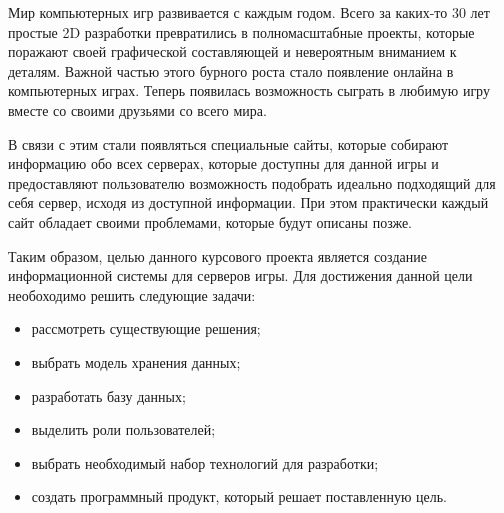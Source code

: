 \maketableofcontents

\intro

Мир компьютерных игр развивается с каждым годом. Всего за каких-то 30 лет простые 2D разработки превратились в полномасштабные проекты, которые поражают своей графической составляющей и невероятным вниманием к деталям. Важной частью этого бурного роста стало появление онлайна в компьютерных играх. Теперь появилась возможность сыграть в любимую игру вместе со своими друзьями со всего мира.

В связи с этим стали появляться специальные сайты, которые собирают информацию обо всех серверах, которые доступны для данной игры и предоставляют пользователю возможность подобрать идеально подходящий для себя сервер, исходя из доступной информации. При этом практически каждый сайт обладает своими проблемами, которые будут описаны позже.

Таким образом, целью данного курсового проекта является создание информационной системы для серверов игры. Для достижения данной цели необоходимо решить следующие задачи:

\begin{itemize}
	\item рассмотреть существующие решения;
	\item выбрать модель хранения данных;
	\item разработать базу данных;
	\item выделить роли пользователей;
	\item выбрать необходимый набор технологий для разработки;
	\item создать программный продукт, который решает поставленную цель.
\end{itemize}
